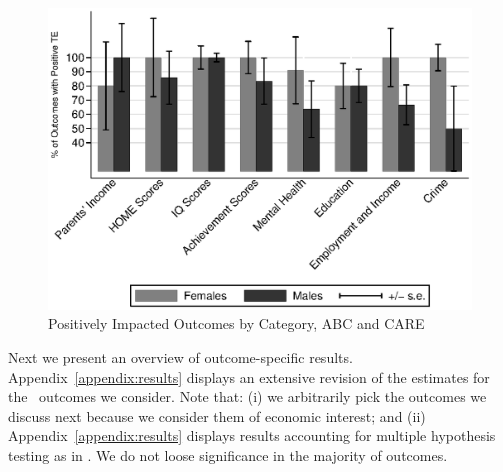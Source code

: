 \begin{figure}[H]
		\caption{Positively Impacted Outcomes by Category, ABC and CARE} \label{fig:ppositivecategory1}
		\includegraphics[width=.9\columnwidth]{output/itt_noctrl_cats1.eps}
\end{figure}

\noindent Next we present an overview of outcome-specific results. Appendix~\ref{appendix:results} displays an extensive revision of the estimates for the \noutcomes\ outcomes we consider. Note that: (i) we arbitrarily pick the outcomes we discuss next because we consider them of economic interest; and (ii) Appendix~\ref{appendix:results} displays results accounting for multiple hypothesis testing as in \citet{Lehman_Romano_2005_AnnStat,Romano_Shaikh_2006_AnnStat}. We do not loose significance in the majority of outcomes.\\


